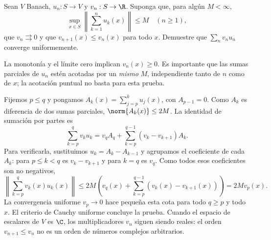 \begin{ejercicio}
Sean $V$ Banach, $u_n:S\to V$ y $v_n:S\to\R$. Suponga que, para algún $M<\infty$,
\[
 \sup_{x\in S}\left\|\sum_{k=1}^nu_k(x)\right\|\le M\quad(n\ge1),
\]
que $v_n\rightrightarrows0$ y que $v_{n+1}(x)\le v_n(x)$ para todo $x$. Demuestre que $\sum_nv_nu_n$ converge uniformemente.
\end{ejercicio}
\begin{solucion}
La monotonía y el límite cero implican $v_n(x)\ge0$. Es importante que las sumas parciales de $u_n$ estén acotadas por un \emph{mismo} $M$, independiente tanto de $n$ como de $x$; la acotación puntual no basta para esta prueba.

Fijemos $p\le q$ y pongamos $A_k(x)=\sum_{j=p}^ku_j(x)$, con $A_{p-1}=0$. Como $A_k$ es diferencia de dos sumas parciales, $\norm{A_k(x)}\le2M$. La identidad de sumación por partes es
\[
 \sum_{k=p}^qv_k u_k
 =v_qA_q+\sum_{k=p}^{q-1}(v_k-v_{k+1})A_k.
\]
Para verificarla, sustituimos $u_k=A_k-A_{k-1}$ y agrupamos el coeficiente de cada $A_k$: para $p\le k<q$ es $v_k-v_{k+1}$ y para $k=q$ es $v_q$. Como todos esos coeficientes son no negativos,
\[
 \left\|\sum_{k=p}^qv_k(x)u_k(x)\right\|
 \le2M\left(v_q(x)+\sum_{k=p}^{q-1}(v_k(x)-v_{k+1}(x))\right)
 =2Mv_p(x).
\]
La convergencia uniforme $v_p\to0$ hace pequeña esta cota para todo $q\ge p$ y todo $x$. El criterio de Cauchy uniforme concluye la prueba. Cuando el espacio de escalares de $V$ es $\C$, los multiplicadores $v_n$ siguen siendo reales: el orden $v_{n+1}\le v_n$ no es un orden de números complejos arbitrarios.
\end{solucion}

